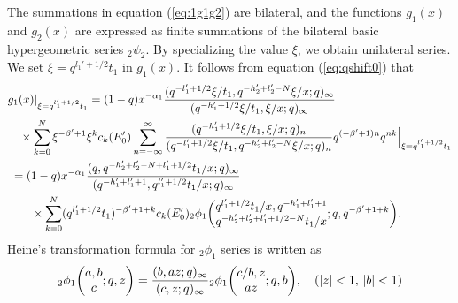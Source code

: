 \documentclass[12pt]{amsart}
\numberwithin{equation}{section}
\theoremstyle{definition}
\theoremstyle{remark}
\begin{document}
The summations in equation (\ref{eq:1g1g2}) are bilateral, and the functions $g_1(x)$ and $g_2 (x) $ are expressed as finite summations of the bilateral basic hypergeometric series $_2\psi _2$.
By specializing the value $\xi$, we obtain unilateral series.
We set $\xi = q^{l_{1}' + 1/2}t_{1}$ in $g_1 (x)$.
It follows from equation (\ref{eq:qshift0}) that 
   \begin{align*}
  &  g_1 (x) | _{\xi = q^{l_{1}' + 1/2}t_{1} } = (1 - q) x^{-\alpha_{1}} \frac{(q^{-l_{1}' + 1/2}\xi/t_{1}, q^{-h_{2}' + l_{2}' - N}\xi/x; q)_{\infty}}{(q^{-h_{1}' + 1/2}\xi/t_{1}, \xi/x; q)_{\infty}} \\
& \quad \times  \sum_{k = 0}^{N} \xi^{-\beta' + 1} \xi^{k} c_{k} (E'_0 ) \sum_{n = -\infty}^{\infty} \frac{(q^{-h_{1}' + 1/2}\xi/t_{1}, \xi/x; q)_{n}}{(q^{-l_{1}' + 1/2}\xi/t_{1}, q^{-h_{2}' + l_{2}' - N}\xi/x; q)_{n}} q^{(-\beta' + 1)n} q^{n k} \Big| _{\xi = q^{l_{1}' + 1/2}t_{1} } \\
& \; = (1 - q)x^{-\alpha_{1}}\frac{(q, q^{-h_{2}' + l_{2}' - N + l_{1}' + 1/2}t_{1}/x; q)_{\infty}}{(q^{-h_{1}' + l_{1}' + 1}, q^{l_{1}' + 1/2}t_{1}/x; q)_{\infty}} \\
    &\qquad \times  \sum_{k = 0}^{N} (q^{l_{1}' + 1/2}t_{1})^{-\beta' + 1 + k} c_{k} (E'_0 )
    {}_2\phi_1 \biggl( \begin{array}{@{}c@{}} q^{l_{1}' + 1/2}t_{1}/x, q^{-h_{1}' + l_{1}' + 1} \\
q^{-h_{2}' + l_{2}' + l_{1}' + 1/2 - N}t_{1}/x \end{array} ;q,q^{-\beta' + 1 + k} \biggr) . \notag
  \end{align*}
Heine's transformation formula for $_{2}\phi_{1}$ series is written as
  \begin{align}
    {}_2\phi_1 \biggl( \begin{array}{@{}c@{}} a, b \\
c \end{array} ;q,z \biggr)
    = \frac{(b, az; q)_{\infty}}{(c, z; q)_{\infty}}
    {}_2\phi_1 \biggl( \begin{array}{@{}c@{}} c/b, z \\
az \end{array} ;q,b \biggr), \quad (|z| < 1, \, |b| <1) \label{eq:Heine}
  \end{align}
\end{document}
